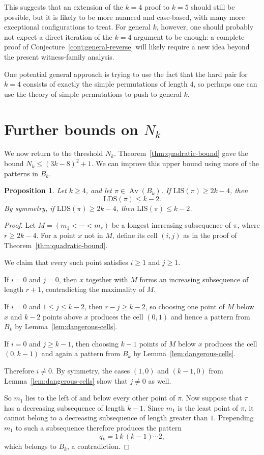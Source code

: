 \documentclass[11pt]{amsart}
\newcommand{\Av}{\operatorname{Av}}
\theoremstyle{plain}
\newtheorem{proposition}[theorem]{Proposition}
\theoremstyle{definition}
\theoremstyle{remark}
\begin{document}
This suggests that an extension of the $k=4$ proof to $k=5$ should still be possible, but
it is likely to be more nuanced and case-based, with many more exceptional configurations to treat.
For general $k$, however, one should probably not expect a direct iteration of the $k=4$ argument to
be enough: a complete proof of Conjecture~\ref{conj:general-reverse} will likely require a new idea
beyond the present witness-family analysis.

One potential general approach is trying to use the fact that the hard pair for $k=4$
consists of exactly the simple permutations of length $4$, so perhaps one can use the
theory of simple permutations to push to general $k$.

\section{Further bounds on \texorpdfstring{$N_k$}{Nk}}\label{sec:further-nk}

We now return to the threshold $N_k$.  Theorem~\ref{thm:quadratic-bound} gave the bound
$N_k \leq (3k-8)^2+1$.  We can improve this upper bound using more of the patterns in $B_k$.

\begin{proposition}\label{prop:intermediate-lis-lds}
  Let $k \geq 4$, and let $\pi \in \Av(B_k)$.  If $\mathrm{LIS}(\pi) \geq 2k-4$, then
  \[
    \mathrm{LDS}(\pi)\leq k-2.
  \]
  By symmetry, if $\mathrm{LDS}(\pi) \geq 2k-4$, then $\mathrm{LIS}(\pi)\leq k-2$.
\end{proposition}

\begin{proof}
  Let $M=(m_1<\cdots<m_r)$ be a longest increasing subsequence of $\pi$, where $r \geq 2k-4$.  For a
  point $x$ not in $M$, define its cell $(i,j)$ as in the proof of
  Theorem~\ref{thm:quadratic-bound}.

  We claim that every such point satisfies $i \geq 1$ and $j \geq 1$.

  If $i=0$ and $j=0$, then $x$ together with $M$ forms an increasing subsequence of length $r+1$,
  contradicting the maximality of $M$.

  If $i=0$ and $1 \leq j \leq k-2$, then $r-j \geq k-2$, so choosing one point of $M$ below $x$ and
  $k-2$ points above $x$ produces the cell $(0,1)$ and hence a pattern from $B_k$ by
  Lemma~\ref{lem:dangerous-cells}.

  If $i=0$ and $j \geq k-1$, then choosing $k-1$ points of $M$ below $x$ produces the cell $(0,k-1)$
  and again a pattern from $B_k$ by Lemma~\ref{lem:dangerous-cells}.

  Therefore $i \neq 0$.  By symmetry, the cases $(1,0)$ and $(k-1,0)$ from
  Lemma~\ref{lem:dangerous-cells} show that $j \neq 0$ as well.

  So $m_1$ lies to the left of and below every other point of $\pi$.  Now suppose that $\pi$ has a
  decreasing subsequence of length $k-1$.  Since $m_1$ is the least point of $\pi$, it cannot belong
  to a decreasing subsequence of length greater than $1$.  Prepending $m_1$ to such a subsequence
  therefore produces the pattern
  \[
    q_k=1\,k\,(k-1)\cdots 2,
  \]
  which belongs to $B_k$, a contradiction.
\end{proof}
\end{document}
